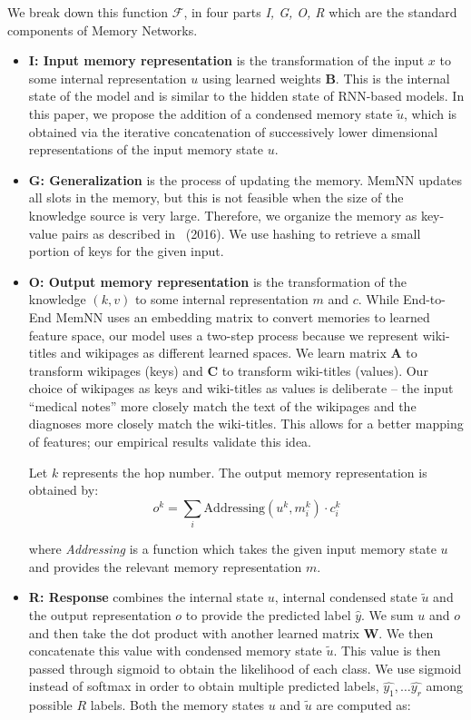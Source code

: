     We break down this function $\mathcal{F}$, in four parts \textit{I, G, O, R} which are the standard components of Memory Networks.
    \begin{itemize}
        \item \textbf{I: Input memory representation} is the transformation of the input $x$ to some internal representation $u$ using learned weights $\boldsymbol{B}$. This is the internal state of the model and is similar to the hidden state of RNN-based models. In this paper, we propose the addition of a condensed memory state $\widetilde{u}$, which is obtained via the iterative concatenation of successively lower dimensional representations of the input memory state $u$. 
        \item \textbf{G: Generalization} is the process of updating the memory. MemNN updates all slots in the memory, but this is not feasible when the size of the knowledge source is very large. Therefore,  we organize the memory as key-value pairs as described in~\citeauthor{DBLP:journals/corr/MillerFDKBW16} (2016). We use hashing to retrieve a small portion of keys for the given input.  

        \item \textbf{O: Output memory representation} is the transformation of the knowledge $(k,v)$ to some internal representation $m$ and $c$. While End-to-End MemNN uses an embedding matrix to convert memories to learned feature space, our model uses a two-step process because we represent wiki-titles and wikipages as different learned spaces. We learn matrix $\boldsymbol{A}$ to transform wikipages (keys) and $\boldsymbol{C}$ to transform wiki-titles (values). Our choice of wikipages as keys and wiki-titles as values is deliberate -- the input ``medical notes'' more closely match the text of the wikipages and the diagnoses more closely match the wiki-titles. This allows for a better mapping of features; our empirical results validate this idea.

        Let $k$ represents the hop number. The output memory representation is obtained by:
            \begin{equation}
                o^k = \sum_i \text{Addressing}(u^k, m_i^k) \cdot c_i^k  
            \end{equation}
            
        where \textit{Addressing} is a function which takes the given input memory state $u$ and provides the relevant memory representation $m$.

    \item \textbf{R: Response} combines the internal state $u$, internal condensed state $\widetilde{u}$ and the output representation $o$ to provide the predicted label $\hat{y}$. We sum $u$ and $o$ and then take the dot product with another learned matrix $\boldsymbol{W}$. We then concatenate this value with condensed memory state $\widetilde{u}$. This value is then passed through sigmoid to obtain the likelihood of each class. We use sigmoid instead of softmax in order to obtain multiple predicted labels, $\hat{y_1}, \ldots \hat{y_r}$ among possible $R$ labels. Both the memory states $u$ and $\widetilde{u}$ are computed as:
            

\end{itemize}
